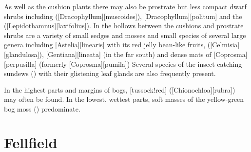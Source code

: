 As well as the cushion plants there may also be prostrate but less compact dwarf shrubs including  ([Dracophyllum][muscoides]), [Dracophyllum][politum] and the  ([Lepidothamnus][laxifolius]).
In the hollows between the cushions and prostrate shrubs are a variety of small sedges and mosses and small species of several large genera including [Astelia][linearis] with its red jelly bean-like fruits,  ([Celmisia][glandulosa]), [Gentiana][lineata] (in the far south) and dense mats of [Coprosma][perpusilla] (formerly [Coprosma][pumila]) Several species of the insect catching sundews () with their glistening leaf glands are also frequently present.

In the highest parts and margins of bogs, [tussock!red] ([Chionochloa][rubra]) may often be found.
In the lowest, wettest parts, soft masses of the yellow-green bog moss () predominate.

\section{Fellfield}

